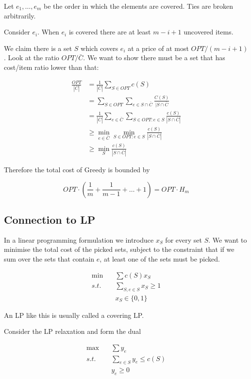 \begin{pr} Let $e_1,\ldots,e_m$ be the order in which the elements are covered. Ties are broken arbitrarily.

Consider $e_i$. When $e_i$  is covered there are at least $m-i+1$ uncovered items.

We claim there is a set $S$ which covers $e_i$ at a price of at most $OPT/(m-i+1)$. Look at the ratio $OPT/\bar C$. We want to show there must be a set that has cost/item ratio lower than that:

\begin{align*}
\frac{OPT}{|\bar C|} &= \frac{1}{|\bar C|}\sum_{S\in OPT} c(S)\\
	&= \sum_{S\in OPT} \sum_{e\in S\cap \bar C} \frac{C(S)}{|S\cap \bar C}\\
	&= \frac{1}{|\bar C|} \sum_{e\in \bar C} \sum_{S\in OPT: e\in S} \frac{c(S)}{|S\cap \bar C|}\\
	&\geq \min_{e\in \bar C} \min_{S\in OPT:e\in S} \frac{c(S)}{|S\cap \bar C|}\\
	&\geq \min_S \frac{c(S)}{|S\cap \bar C|}
\end{align*}

Therefore the total cost of Greedy is bounded by

\[OPT \cdot (\frac{1}{m} + \frac{1}{m-1} + \ldots + 1) = OPT \cdot H_m\]
\end{pr}

\subsection{Connection to LP}

In a linear programming formulation we introduce $x_S$ for every set $S$. We want to minimise the total cost of the picked sets, subject to the constraint that if we sum over the sets that contain $e$, at least one of the sets must be picked.

\begin{align*}
\min \quad & \sum c(S) x_S\\
s.t. \quad & \sum_{S,e\in S} x_S \geq 1\\
	& x_S \in \{0,1\}
\end{align*}

An LP like this is usually called a covering LP.

Consider the LP relaxation and form the dual

\begin{align*}
\max \quad & \sum y_e\\
s.t. \quad & \sum_{e\in S} y_e \leq c(S)\\
	& y_e \geq 0
\end{align*}


